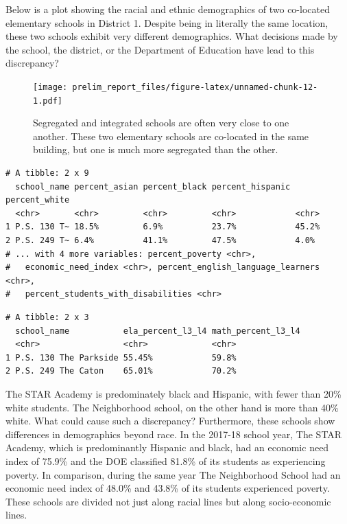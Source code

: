 \documentclass[11pt,]{article}
\begin{document}
Below is a plot showing the racial and ethnic demographics of two co-located elementary schools in District 1. Despite being in literally the same location, these two schools exhibit very different demographics. What decisions made by the school, the district, or the Department of Education have lead to this discrepancy?
\begin{figure}
\centering
\texttt{[image: prelim\_report\_files/figure-latex/unnamed-chunk-12-1.pdf]}
\caption{\label{fig:unnamed-chunk-12}Segregated and integrated schools are often very close to one another. These two elementary schools are co-located in the same building, but one is much more segregated than the other.}
\end{figure}
\begin{verbatim}
# A tibble: 2 x 9
  school_name percent_asian percent_black percent_hispanic percent_white
  <chr>       <chr>         <chr>         <chr>            <chr>        
1 P.S. 130 T~ 18.5%         6.9%          23.7%            45.2%        
2 P.S. 249 T~ 6.4%          41.1%         47.5%            4.0%         
# ... with 4 more variables: percent_poverty <chr>,
#   economic_need_index <chr>, percent_english_language_learners <chr>,
#   percent_students_with_disabilities <chr>
\end{verbatim}
\begin{verbatim}
# A tibble: 2 x 3
  school_name           ela_percent_l3_l4 math_percent_l3_l4
  <chr>                 <chr>             <chr>             
1 P.S. 130 The Parkside 55.45%            59.8%             
2 P.S. 249 The Caton    65.01%            70.2%             
\end{verbatim}
The STAR Academy is predominately black and Hispanic, with fewer than 20\% white students. The Neighborhood school, on the other hand is more than 40\% white. What could cause such a discrepancy? Furthermore, these schools show differences in demographics beyond race. In the 2017-18 school year, The STAR Academy, which is predominantly Hispanic and black, had an economic need index of 75.9\% and the DOE classified 81.8\% of its students as experiencing poverty. In comparison, during the same year The Neighborhood School had an economic need index of 48.0\% and 43.8\% of its students experienced poverty. These schools are divided not just along racial lines but along socio-economic lines.
\end{document}

